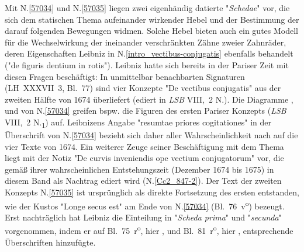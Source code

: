 
\begin{ledgroup}
\footnotesize
\pstart
\noindent
Mit N.\;\ref{57034} und N.\;\ref{57035} liegen zwei eigenhändig datierte "\textit{Schedae}" vor, die sich dem statischen Thema aufeinander wirkender Hebel und der Bestimmung der darauf folgenden Bewegungen widmen. 
Solche Hebel bieten auch ein gutes Modell für die Wechselwirkung der ineinander verschränkten Zähne zweier Zahnräder, deren Eigenschaften Leibniz in N.\;\ref{intro_vectibus-conjugatis} ebenfalls behandelt ("de figuris dentium in rotis").
\pend
\pstart
Leibniz hatte sich bereits in der Pariser Zeit mit diesen Fragen beschäftigt: In unmittelbar benachbarten Signaturen (LH~XXXVII~3, Bl.~77) sind vier Konzepte \cite{02160}"De vectibus conjugatis" aus der zweiten Hälfte von 1674 überliefert (ediert in \textit{LSB} VIII,~2 N.). 
Die Diagramme ,  und  von N.\;\ref{57034} greifen bspw. die Figuren des ersten Pariser Konzepts (\textit{LSB} VIII,~2 N.\textsubscript{1}) auf.
Leibnizens Angabe "resumtae priores cogitationes" in der Überschrift von N.\;\ref{57034} bezieht sich daher aller Wahrscheinlichkeit nach auf die vier Texte von 1674.
Ein weiterer Zeuge seiner Beschäftigung mit dem Thema liegt mit der Notiz "De curvis inveniendis ope vectium conjugatorum" vor, die gemäß ihrer wahrscheinlichen Entstehungszeit (Dezember 1674 bis 1675) in diesem Band als Nachtrag ediert wird (N.\;\ref{Cc2_847-2}).
\pend
\pstart
Der Text der zweiten Konzepts N.\;\ref{57035} ist ursprünglich als direkte Fortsetzung des ersten entstanden, wie der Kustos "Longe secus est" am Ende von N.\;\ref{57034} (Bl.~76~v\textsuperscript{o}) bezeugt.
Erst nachträglich hat Leibniz die Einteilung in "\textit{Scheda prima}" und "\textit{secunda}" vorgenommen, 
indem er auf Bl.~75~r\textsuperscript{o}, hier , und Bl.~81~r\textsuperscript{o}, hier , entsprechende Überschriften hinzufügte.
\pend
\end{ledgroup}
